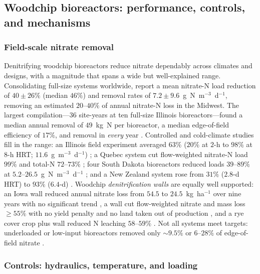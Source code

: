 \documentclass[11pt]{article}
\begin{document}
\subsection{Woodchip bioreactors: performance, controls, and mechanisms}

\subsubsection{Field-scale nitrate removal}

Denitrifying woodchip bioreactors reduce nitrate dependably across climates
and designs, with a magnitude that spans a wide but well-explained range.
Consolidating full-size systems worldwide, \textcite{Christianson2021} report
a mean nitrate-N load reduction of $40\pm26\%$ (median $46\%$) and removal
rates of $7.2\pm9.6$~g~N~m$^{-3}$~d$^{-1}$, removing an estimated $20$--$40\%$
of annual nitrate-N loss in the Midwest. The largest compilation---36
site-years at ten full-size Illinois bioreactors---found a median annual
removal of $49$~kg~N per bioreactor, a median edge-of-field efficiency of
$17\%$, and removal in \emph{every} year \parencite{Christianson2026}.
Controlled and cold-climate studies fill in the range: an Illinois field
experiment averaged $63\%$ ($20\%$ at $2$-h to $98\%$ at $8$-h HRT;
$11.6$~g~m$^{-3}$~d$^{-1}$) \parencite{Bell2015}; a Quebec system cut
flow-weighted nitrate-N load $99\%$ and total-N $72$--$73\%$
\parencite{Husk2017}; four South Dakota bioreactors reduced loads $39$--$89\%$
at $5.2$--$26.5$~g~N~m$^{-3}$~d$^{-1}$ \parencite{Thapa2023}; and a New Zealand
system rose from $31\%$ ($2.8$-d HRT) to $93\%$ ($6.4$-d)
\parencite{Rivas2020}. Woodchip \emph{denitrification walls} are equally well
supported: an Iowa wall reduced annual nitrate loss from $54.5$ to
$24.5$~kg~ha$^{-1}$ over nine years with no significant trend
\parencite{Moorman2010}, a wall cut flow-weighted nitrate and mass loss
$\geq55\%$ with no yield penalty and no land taken out of production
\parencite{Jaynes2008}, and a rye cover crop plus wall reduced N leaching
$58$--$59\%$ \parencite{Rogovska2023}. Not all systems meet targets:
underloaded or low-input bioreactors removed only $\sim9.5\%$
\parencite{Bock2018} or $6$--$28\%$ of edge-of-field nitrate \parencite{Maxwell2022}.

\subsubsection{Controls: hydraulics, temperature, and loading}
\end{document}
